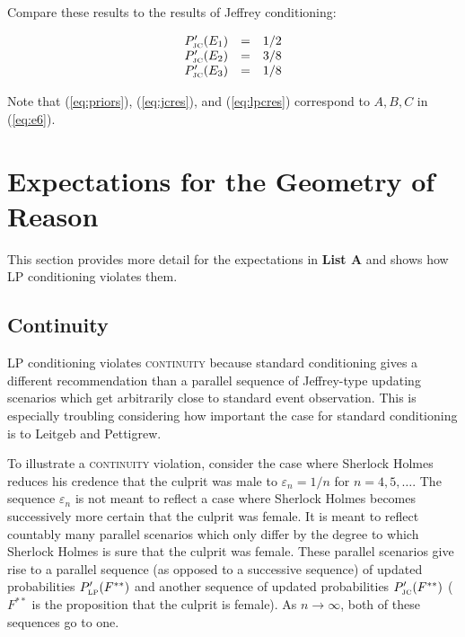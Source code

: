 \documentclass[smallextended]{svjour3}       %
\begin{document}
Compare these results to the results of Jeffrey conditioning:

\begin{equation}
  \label{eq:jcres}
  \begin{array}{rcl}
    P'_{\mbox{\tiny JC}}(E_{1})&=&1/2 \\
    P'_{\mbox{\tiny JC}}(E_{2})&=&3/8 \\
    P'_{\mbox{\tiny JC}}(E_{3})&=&1/8
  \end{array}
\end{equation}

Note that (\ref{eq:priors}), (\ref{eq:jcres}), and (\ref{eq:lpcres})
correspond to $A,B,C$ in (\ref{eq:e6}). 

\section{Expectations for the Geometry of Reason}
\label{fivex}

This section provides more detail for the expectations in \textbf{List
  A} and shows how LP conditioning violates them.

\subsection{Continuity}
\label{Continuity}

LP conditioning violates \textsc{continuity} because standard
conditioning gives a different recommendation than a parallel sequence
of Jeffrey-type updating scenarios which get arbitrarily close to
standard event observation. This is especially troubling considering
how important the case for standard conditioning is to Leitgeb and
Pettigrew.

To illustrate a \textsc{continuity} violation, consider the case where
Sherlock Holmes reduces his credence that the culprit was male to
$\varepsilon_{n}=1/n$ for $n=4,5,\ldots$. The sequence
$\varepsilon_{n}$ is not meant to reflect a case where Sherlock Holmes
becomes successively more certain that the culprit was female. It is
meant to reflect countably many parallel scenarios which only differ
by the degree to which Sherlock Holmes is sure that the culprit was
female. These parallel scenarios give rise to a parallel sequence (as
opposed to a successive sequence) of updated probabilities
$P'_{\mbox{\tiny LP}}(F^{**})$ and another sequence of updated
probabilities $P'_{\mbox{\tiny JC}}(F^{**})$ ($F^{**}$ is the
proposition that the culprit is female). As $n\rightarrow\infty$, both
of these sequences go to one.
\end{document}
